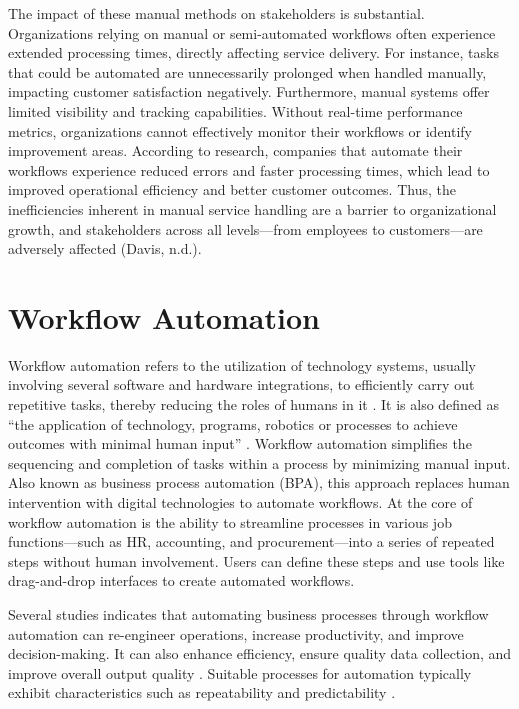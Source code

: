 The impact of these manual methods on stakeholders is substantial. Organizations relying on manual or semi-automated workflows often experience extended processing times, directly affecting service delivery. For instance, tasks that could be automated are unnecessarily prolonged when handled manually, impacting customer satisfaction negatively. Furthermore, manual systems offer limited visibility and tracking capabilities. Without real-time performance metrics, organizations cannot effectively monitor their workflows or identify improvement areas. According to research, companies that automate their workflows experience reduced errors and faster processing times, which lead to improved operational efficiency and better customer outcomes. Thus, the inefficiencies inherent in manual service handling are a barrier to organizational growth, and stakeholders across all levels—from employees to customers—are adversely affected (Davis, n.d.).

\section{Workflow Automation}

Workflow automation refers to the utilization of technology systems, usually involving several software and hardware integrations, to efficiently carry out repetitive tasks, thereby reducing the roles of humans in it \cite{winarko2021}. It is also defined as “the application of technology, programs, robotics or processes to achieve outcomes with minimal human input” \cite{ibm}. Workflow automation simplifies the sequencing and completion of tasks within a process by minimizing manual input. Also known as business process automation (BPA), this approach replaces human intervention with digital technologies to automate workflows. At the core of workflow automation is the ability to streamline processes in various job functions—such as HR, accounting, and procurement—into a series of repeated steps without human involvement. Users can define these steps and use tools like drag-and-drop interfaces to create automated workflows. 

Several studies indicates that automating business processes through workflow automation can re-engineer operations, increase productivity, and improve decision-making\cite{abecker2000, aversano2002}. It can also enhance efficiency, ensure quality data collection, and improve overall output quality \cite{pakdil2009}. Suitable processes for automation typically exhibit characteristics such as repeatability and predictability \cite{basu2002}. 

